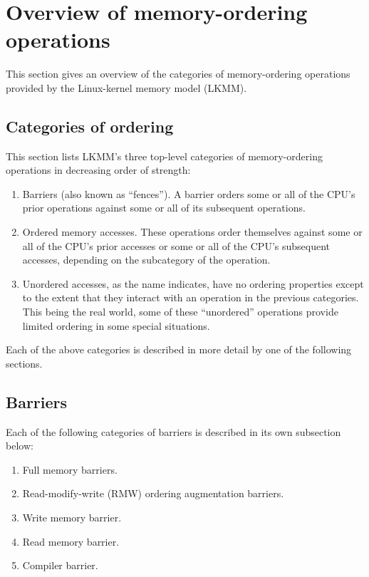 \section{Overview of memory-ordering operations}

This section gives an overview of the categories of memory-ordering
operations provided by the Linux-kernel memory model (LKMM).


\subsection{Categories of ordering}

This section lists LKMM's three top-level categories of memory-ordering
operations in decreasing order of strength:

\begin{enumerate}
 \item	Barriers (also known as ``fences'').
	A barrier orders some or all of the CPU's prior operations
	against some or all of its subsequent operations.

 \item	Ordered memory accesses.
	These operations order themselves against some or all of
	the CPU's prior accesses or some or all	of the CPU's subsequent
	accesses, depending on the subcategory of the operation.

 \item	Unordered accesses, as the name indicates, have no ordering
	properties except to the extent that they interact with an
	operation in the previous categories.
	This being the real world, some of these ``unordered''
	operations provide limited ordering in some special situations.
\end{enumerate}

Each of the above categories is described in more detail by one of the
following sections.


\subsection{Barriers}

Each of the following categories of barriers is described in its own
subsection below:

\begin{enumerate}
 \item	Full memory barriers.

 \item	Read-modify-write (RMW) ordering augmentation barriers.

 \item	Write memory barrier.

 \item	Read memory barrier.

 \item	Compiler barrier.
\end{enumerate}

